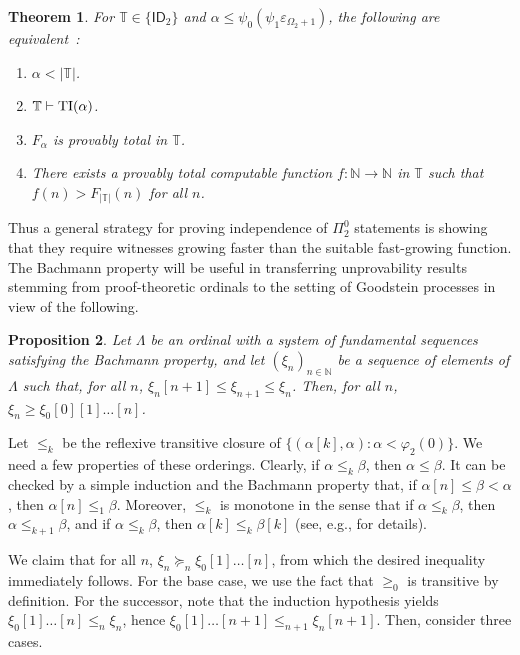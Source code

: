 \documentclass{amsart}
\theoremstyle{plain}
\theoremstyle{plain}
\newtheorem{theorem}{Theorem}
\newtheorem{proposition}[theorem]{Proposition}
\newcommand{\ID}{\mathsf{ID}}
\newcommand{\Om}{{\Omega}}
\newcommand{\al}{{\alpha}}
\newcommand{\be}{{\beta}}
\newcommand\Nat{\mathbb{N}}
\begin{document}
\begin{theorem}
For $\mathbb{T}\in \{ \ID_2\}$ and $\al\leq \psi_0(\psi_1\varepsilon_{\Om_2+1})$, the following are equivalent~\cite{BuchholzCW1994}:
\begin{enumerate}

\item $\al<|\mathbb{T}|$.

\item $\mathbb{T} \vdash {\rm TI}( \al)$.

\item $F_\al$ is provably total in $\mathbb{T}$.

\item There exists a provably total computable function $f\colon \Nat\to \Nat$ in $\mathbb{T}$ such that $f(n) > F_{|\mathbb{T}|}(n)$ for all $n$.
\end{enumerate}
\end{theorem}
Thus a general strategy for proving independence of $\Pi^0_2$ statements is
showing that they require witnesses growing faster than the suitable fast-growing
function.
The Bachmann property will be useful in transferring unprovability results stemming from proof-theoretic ordinals to the setting of Goodstein processes in view of the following.

\begin{proposition}\label{prop:Majorize}
Let $\Lambda$ be an ordinal with a system of fundamental sequences satisfying the Bachmann property, and let $(\xi_n)_{n\in \mathbb N}$ be a sequence of elements of $\Lambda$ such that, for all $n$, $\xi_n[n+1] \leq \xi_{n+1} \leq \xi_n$.
Then, for all $n$, $\xi_n \geq \xi_0 [0][1] \ldots [n]$.
\end{proposition}

\proof
Let $\leq_k$ be the reflexive transitive closure of $\{(\al[k],\al):\al<\varphi_2(0)\}$. We need a few properties of these orderings.
           Clearly, if $\al \leq_k \be$, then $\al \leq \be$.
                     It can be checked by a simple induction and the Bachmann property that, if $\alpha[n] \leq \beta < \alpha$, then $\alpha[n] \leq_1 \beta$.
Moreover, $\leq_k$ is monotone in the sense that if
          $\al\leq_k \be$, then $\al\leq_{k+1}\be$, and if $\alpha\leq _k \beta$, then $\alpha[k] \leq_k \beta[k]$ (see, e.g., \cite{Schmidt1977} for details).


We claim that for all $n$, $\xi_n \succeq _n \xi_0[1]\ldots[n]$, from which the desired inequality immediately follows.
For the base case, we use the fact that $\geq_0$ is transitive by definition.
For the successor, note that the induction hypothesis yields $\xi_0[1]\ldots[n] \leq_n \xi_n $, hence $\xi_0[1]\ldots[n+1] \leq_{n+1} \xi_n[n+1] $.
Then, consider three cases.
\end{document}
